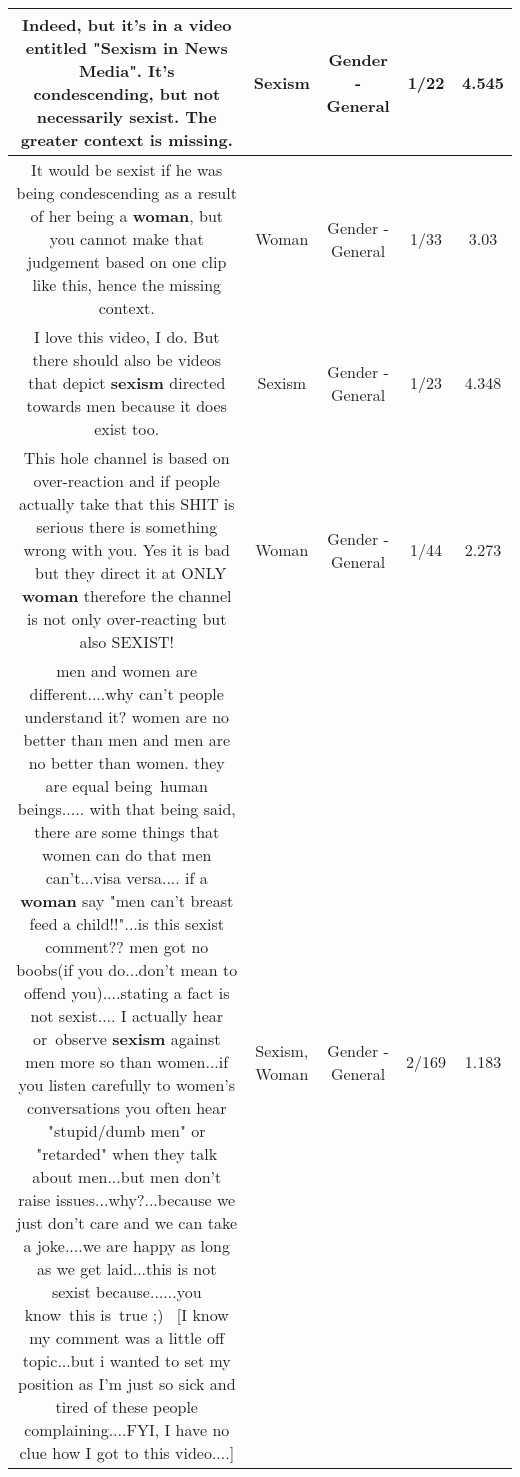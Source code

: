 \documentclass[11pt]{article}
\newlength\mylength
\begin{document}
\begin{center}
\begin{longtable}{|C{.65\mylength}|C{.30\mylength}|C{.12\mylength}|C{.12\mylength}|C{.12\mylength}|}
  \small Indeed, but it's in a video entitled "\textbf{Sexism} in News Media". It's condescending, but not necessarily sexist. The greater context is missing.\normalsize   & Sexism & Gender - General & 1/22 & 4.545 \\  \hline
  \small It would be sexist if he was being condescending as a result of her being a \textbf{woman}, but you cannot make that judgement based on one clip like this, hence the missing context.\normalsize   & Woman & Gender - General & 1/33 & 3.03 \\  \hline
  \small I love this video, I do. But there should also be videos that depict \textbf{sexism} directed towards men because it does exist too.\normalsize   & Sexism & Gender - General & 1/23 & 4.348 \\  \hline
  \small This hole channel is based on over-reaction and if people actually take that this SHIT is serious there is something wrong with you. Yes it is bad  but they direct it at ONLY \textbf{woman} therefore the channel is not only over-reacting but also SEXIST!\normalsize   & Woman & Gender - General & 1/44 & 2.273 \\  \hline
  \small men and women are different....why can't people understand it? women are no better than men and men are no better than women. they are equal being human beings..... with that being said, there are some things that women can do that men can't...visa versa.... if a \textbf{woman} say "men can't breast feed a child!!"...is this sexist comment?? men got no boobs(if you do...don't mean to offend you)....stating a fact is not sexist.... I actually hear or observe \textbf{sexism} against men more so than women...if you listen carefully to women's conversations you often hear "stupid/dumb men" or "retarded" when they talk about men...but men don't raise issues...why?...because we just don't care and we can take a joke....we are happy as long as we get laid...this is not sexist because......you know this is true ;)  [I know my comment was a little off topic...but i wanted to set my position as I'm just so sick and tired of these people complaining....FYI, I have no clue how I got to this video....]\normalsize   & Sexism, Woman & Gender - General & 2/169 & 1.183 \\  \hline

\end{longtable}
\end{center}
\end{document}
